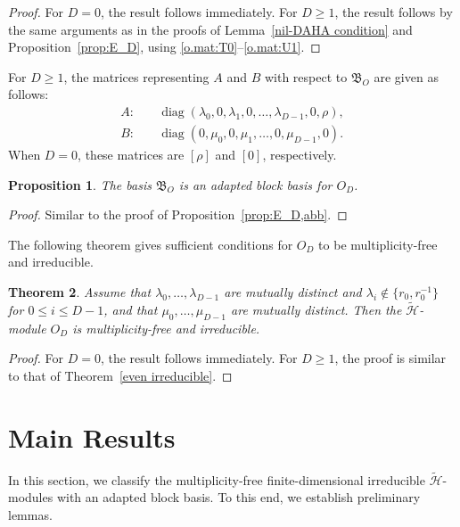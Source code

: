 \documentclass[reqno]{amsart}
\newtheorem{theorem}{Theorem}[section]
\newtheorem{proposition}[theorem]{Proposition}
\theoremstyle{definition}
\begin{document}
\begin{proof}
%
For $D=0$, the result follows immediately.
For $D \geq 1$, the result follows by the same arguments as in the proofs of
Lemma~\ref{nil-DAHA condition} and Proposition~\ref{prop:E_D}, using
\eqref{o.mat:T0}--\eqref{o.mat:U1}.
%
\end{proof}


For $D\geq 1$, the matrices representing $A$ and $B$ with respect to
$\mathfrak{B}_O$ are given as follows:
\begin{align*}
A: \quad &\operatorname{diag}
(\lambda_0,0,\lambda_1,0,\dots,\lambda_{D-1},0,\rho),\\
B: \quad &\operatorname{diag}
(0,\mu_0,0,\mu_1,\dots,0,\mu_{D-1},0).
\end{align*}
When $D=0$, these matrices are $[\rho]$ and $[0]$, respectively.


\begin{proposition}\label{prop:O_D,abb}
%
The basis $\mathfrak{B}_O$ is an adapted block basis for $O_D$.
%
\end{proposition}

\begin{proof}
%
Similar to the proof of Proposition~\ref{prop:E_D,abb}.
%
\end{proof}


The following theorem gives sufficient conditions for $O_D$ to be
multiplicity-free and irreducible.


\begin{theorem}\label{odd irreducible}
%
Assume that $\lambda_0,\dots,\lambda_{D-1}$ are mutually
distinct and $\lambda_i\notin\{r_0,r_0^{-1}\}$ for $0\leq i\leq D-1$, and that
$\mu_0,\dots,\mu_{D-1}$ are mutually distinct.
Then the $\widetilde{\mathcal{H}}$-module $O_D$ is multiplicity-free and irreducible.
%
\end{theorem}

\begin{proof}
%
For $D=0$, the result follows immediately.
For $D\geq 1$, the proof is similar to that of
Theorem~\ref{even irreducible}.
%
\end{proof}




\section{Main Results}\label{Sec:MR}




In this section, we classify the multiplicity-free finite-dimensional irreducible $\widetilde{\mathcal{H}}$-modules with an adapted block basis.
To this end, we establish preliminary lemmas.
\end{document}
